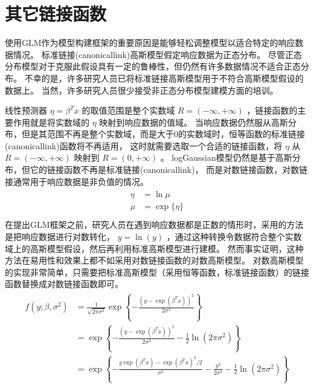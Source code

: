 \documentclass[letterpaper,10pt,english]{sphinxmanual}
\begin{document}
\section{其它链接函数}
\label{\detokenize{_u9ad8_u65af_u6a21_u578b/content:id10}}
使用GLM作为模型构建框架的重要原因是能够轻松调整模型以适合特定的响应数据情况。
标准链接(canonical\sphinxhyphen{}link)高斯模型假定响应数据为正态分布。
尽管正态分布模型对于克服此假设具有一定的鲁棒性，但仍然有许多数据情况不适合正态分布。
不幸的是，许多研究人员已将标准链接高斯模型用于不符合高斯模型假设的数据上。
当然，许多研究人员很少接受非正态分布模型建模方面的培训。


线性预测器 \(\eta=\beta^Tx\) 的取值范围是整个实数域 \(R=(-\infty,+\infty)\)
，链接函数的主要作用就是将实数域的 \(\eta\) 映射到响应数据的值域。
当响应数据仍然服从高斯分布，但是其范围不再是整个实数域，而是大于0的实数域时，恒等函数的标准链接(canonical\sphinxhyphen{}link)函数将不再适用，
这时就需要选取一个合适的链接函数，将 \(\eta\) 从 \(R=(-\infty,+\infty)\) 映射到
\(R=(0,+\infty)\) 。
log\sphinxhyphen{}Gaussian模型仍然是基于高斯分布，但它的链接函数不再是标准链接(canonical\sphinxhyphen{}link)，
而是对数链接函数，对数链接通常用于响应数据是非负值的情况。
\begin{align}\label{equation:高斯模型/content:高斯模型/content:27}\!\begin{aligned}
\eta &= \ln \mu\\
\mu &= \exp \{ \eta\}\\
\end{aligned}\end{align}
在提出GLM框架之前，研究人员在遇到响应数据都是正数的情形时，采用的方法是把响应数据进行对数转化，
\(y=\ln(y)\) ，通过这种转换令数据符合整个实数域上的高斯模型假设，然后再利用标准高斯模型进行建模。
然而事实证明，这种方法在易用性和效果上都不如采用对数链接函数的对数高斯模型。
对数高斯模型的实现非常简单，只需要把标准高斯模型（采用恒等函数，标准链接函数）的链接函数替换成对数链接函数即可。
\begin{align}\label{equation:高斯模型/content:高斯模型/content:28}\!\begin{aligned}
f(y;\beta,\sigma^2) &=\frac{1}{\sqrt{2\pi \sigma^2}} \exp \left \{ - \frac{(y-\exp(\beta^Tx))^2}{2\sigma^2} \right \}\\
&= \exp \left \{ -\frac{(y-\exp(\beta^Tx))^2}{2\sigma^2} - \frac{1}{2} \ln (2\pi\sigma^2) \right \}\\
&= \exp \left \{ -\frac{y\exp(\beta^Tx) - \exp(\beta^Tx)^2/2}{\sigma^2} - \frac{y^2}{2\sigma^2} - \frac{1}{2} \ln (2\pi\sigma^2) \right \}\\
\end{aligned}\end{align}
\end{document}
